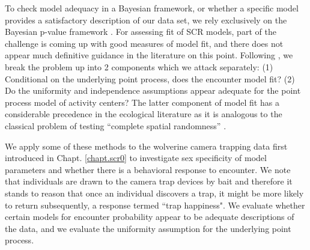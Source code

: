  To check model adequacy in a Bayesian framework, or whether a
specific model provides a satisfactory description of our data set,
we rely exclusively on the Bayesian
p-value framework \citep{gelman_etal:1996}.  For assessing fit of 
SCR models, part of the challenge is coming up with good measures of
model fit, and there does not appear much definitive guidance 
in the literature on this point.  Following \citet{royle_etal:2011mee}, we break the
problem up into 2 components which we attack separately: (1)
Conditional on the underlying point process, does the encounter model
fit? (2) Do the uniformity and independence assumptions appear
adequate for the point process model of activity centers? The latter
component of model fit has a considerable precedence in the
ecological literature as it is analogous to the classical problem of
testing ``complete spatial randomness'' \citep{cressie:1992, illian_etal:2008}.


We apply some of these methods to the wolverine camera trapping
data first introduced in Chapt. \ref{chapt.scr0}
to investigate sex specificity of model parameters and whether
there is a behavioral response to encounter. We note that individuals
are drawn to the camera trap devices by bait and therefore it
stands to reason that once an individual discovers a trap, it  might
be more likely to return subsequently, a response termed
``trap happiness". We evaluate whether certain models for encounter
probability  appear to be
adequate descriptions of the data, and we evaluate the uniformity
assumption for the underlying point process.



\begin{comment}
A basic problem with these two objectives of model selection and model
assessment is their simultaneous use implies a kind of contradiction
which we call the {\it model selectors paradox}: Inferences are always
achieved using standard paradigms of parametric inference (Bayesian or
frequentist) which assert that the model is properly specified. That
is, we assume that the model is truth. This is paradoxical because we
all know that ``all models are wrong'' but, possibly, ``some are
useful.'' In fact, the notion that an ``assumption'' could even be
correct is itself something of an oxymoron.
\end{comment}

\begin{comment}
  Therefore we don't expect
or hope to make assumptions that are ``correct'' in any way. Gelman
and Shalizi (2010) say it this way: ``there is general agreement that,
in this domain, all models in use are wrong -- not just merely
falsifiable, but actually false.''  We should therefore refrain from
over-stating the relevance of any model.  [not sure where I was going
with this point]
\end{comment}




